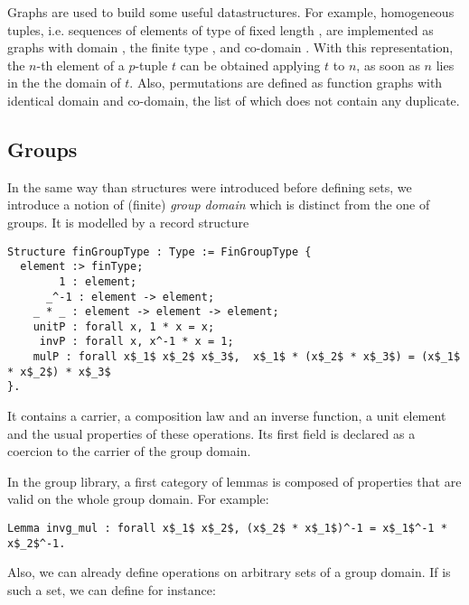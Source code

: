Graphs are used to build some useful datastructures. For example,
homogeneous tuples, i.e. sequences of elements of type  of fixed length , 
are implemented as graphs with domain , the finite type ,
and co-domain . With this representation, the
$n$-th element of a $p$-tuple $t$ can be obtained applying $t$ to $n$,
as soon as $n$ lies in the the domain of $t$. Also, permutations
are defined as function graphs with identical domain and co-domain,
the  list of which does not contain any duplicate.

\subsection{Groups}

In the same way than  structures were introduced before defining
sets, we introduce a notion of (finite) \emph{group domain} which is
distinct from the one of groups. It is modelled by a 
record structure
\begin{lstlisting}
Structure finGroupType : Type := FinGroupType {
  element :> finType;
        1 : element;
      _^-1 : element -> element;
    _ * _ : element -> element -> element;
    unitP : forall x, 1 * x = x;
     invP : forall x, x^-1 * x = 1;
    mulP : forall x$_1$ x$_2$ x$_3$,  x$_1$ * (x$_2$ * x$_3$) = (x$_1$ * x$_2$) * x$_3$
}.
\end{lstlisting}
It contains a carrier, a composition law
and an inverse function, a unit element and the usual properties of these
operations. Its first field is declared as a coercion to the carrier
of the group domain.

In the group library, a first category of lemmas is composed of 
properties that are valid on the whole group domain. For example:

\begin{lstlisting}
Lemma invg_mul : forall x$_1$ x$_2$, (x$_2$ * x$_1$)^-1 = x$_1$^-1 * x$_2$^-1. 
\end{lstlisting}

Also, we can already define operations on arbitrary sets of a group
domain. If  is such a set, we can define for instance:

